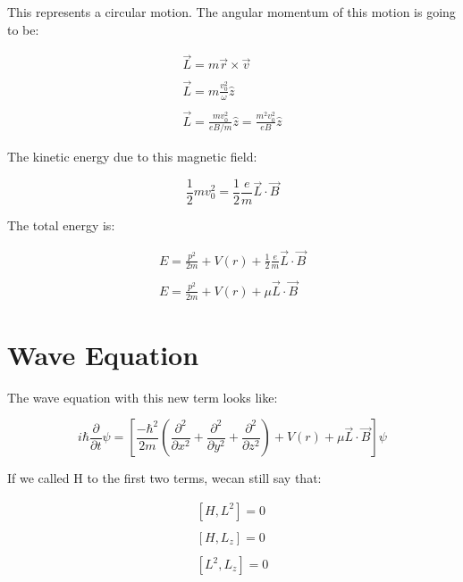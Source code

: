 This represents a circular motion. The angular momentum of this motion is going to be:

\begin{equation}
  \begin{array}{c}
    \vec{L} = m \vec{r} \times \vec{v}
    \\

    \\
    \vec{L} = m \frac{v_0^2}{\omega} \hat{z}
    \\

    \\
    \vec{L} = \frac{mv_0^2}{eB/m} \hat{z} = \frac{m^2v_0^2}{eB} \hat{z}
  \end{array}
\end{equation}

The kinetic energy due to this magnetic field:

\begin{equation}
\frac{1}{2}mv_0^2 = \frac{1}{2} \frac{e}{m} \vec{L} \cdot \vec{B}
\end{equation}

The total energy is:

\begin{equation}
  \begin{array}{c}
    E = \frac{p^2}{2m} + V(r) + \frac{1}{2} \frac{e}{m} \vec{L} \cdot \vec{B}
    \\

    \\
    E = \frac{p^2}{2m} +V(r) + \mu \vec{L} \cdot \vec{B}
  \end{array}
\end{equation}

\section{Wave Equation}

The wave equation with this new term looks like:

\begin{equation}
  i\hbar\frac{\partial}{\partial t}\psi = \left[\frac{-\hbar^2}{2m}\left(\frac{\partial^2}{\partial x^2}+\frac{\partial^2}{\partial y^2}+\frac{\partial^2}{\partial z^2}\right)+V(r)+\mu \vec{L}\cdot\vec{B}\right]\psi
\end{equation}

If we called H to the first two terms, wecan still say that:

\begin{equation}
  \begin{array}{c}
    \left[H,L^2\right] = 0
    \\

    \\
    \left[H,L_z\right] = 0
    \\

    \\
    \left[L^2,L_z\right] = 0
  \end{array}
\end{equation}

